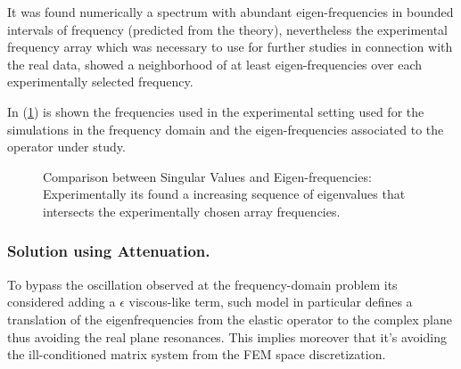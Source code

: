 It was found numerically a spectrum with abundant eigen-frequencies in bounded intervals of frequency (predicted from the theory), nevertheless the experimental frequency array which was necessary to use for further studies in connection with the real data, showed a neighborhood of at least eigen-frequencies over each experimentally selected frequency. 

In (\ref{EigenValuesComparison}) is shown the frequencies used in the experimental setting used for the simulations in the frequency domain and the eigen-frequencies associated to the operator under study.

\begin{figure}[!h]%
    \centering
    \qquad
    \caption{Comparison between Singular Values and Eigen-frequencies: Experimentally its found a increasing sequence of eigenvalues that intersects the experimentally chosen array frequencies.}%
    \label{EigenValuesComparison}%
\end{figure}


\subsubsection{Solution using Attenuation.}
To bypass the oscillation observed at the frequency-domain problem its considered adding a $\epsilon$ viscous-like term, such model in particular defines a translation of the eigenfrequencies from the elastic operator to the complex plane thus avoiding the real plane resonances. This implies moreover that it's avoiding the ill-conditioned matrix system from the FEM space discretization.

